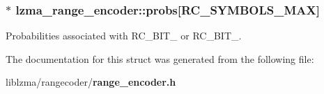 \subsubsection[{probs}]{$\ast$ lzma\-\_\-range\-\_\-encoder\-::probs[{\bf R\-C\-\_\-\-S\-Y\-M\-B\-O\-L\-S\-\_\-\-M\-A\-X}]}\label{structlzma__range__encoder_a9748a5417508b9cba69428f65373177b}


Probabilities associated with R\-C\-\_\-\-B\-I\-T\-\_ or R\-C\-\_\-\-B\-I\-T\-\_. 



The documentation for this struct was generated from the following file\-:\begin{DoxyCompactItemize}
\item 
liblzma/rangecoder/{\bf range\-\_\-encoder.\-h}\end{DoxyCompactItemize}
